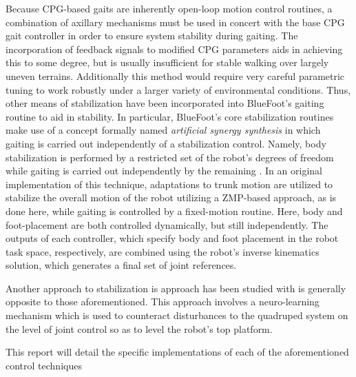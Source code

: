 		Because CPG-based gaits are inherently open-loop motion control routines, a combination of axillary mechanisms must be used in concert with the base CPG gait controller in order to ensure system stability during gaiting. The incorporation of feedback signals to modified CPG parameters aids in achieving this to some degree, but is usually insufficient for stable walking over largely uneven terrains. 
		Additionally this method would require very careful parametric tuning to work robustly under a larger variety of environmental conditions. Thus, other means of stabilization have been incorporated into BlueFoot's gaiting routine to aid in stability. In particular, BlueFoot's core stabilization routines make use of a concept formally named \emph{artificial synergy synthesis} in which gaiting is carried out independently of a stabilization control. Namely, body stabilization is performed by a restricted set of the robot's degrees of freedom while gaiting is carried out independently by the remaining \cite{Vuko1972,Yamaguchi1993}. In an original implementation of this technique, adaptations to trunk motion are utilized to stabilize the overall motion of the robot utilizing a ZMP-based approach, as is done here, while gaiting is controlled by a fixed-motion routine. Here, body and foot-placement are both controlled dynamically, but still independently. The outputs of each controller, which specify body and foot placement in the robot task space, respectively, are combined using the robot's inverse kinematics solution, which generates a final set of joint references.



		Another approach to stabilization is approach has been studied with is generally opposite to those aforementioned. This approach involves a neuro-learning mechanism which is used to counteract disturbances to the quadruped system on the level of joint control so as to level the robot's top platform.
			

		This report will detail the specific implementations of each of the aforementioned control techniques
